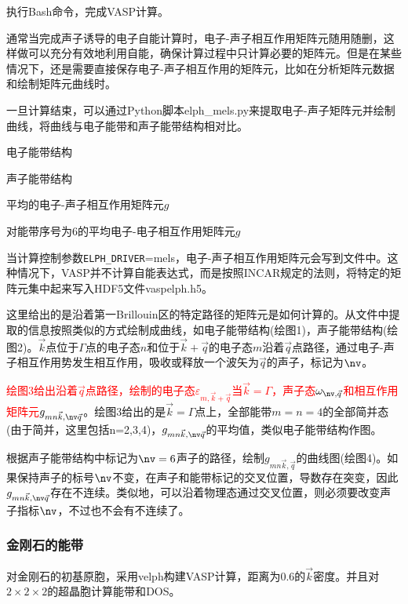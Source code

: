 {执行\textrm{Bash}命令，完成\textrm{VASP}计算。

通常当完成声子诱导的电子自能计算时，电子-声子相互作用矩阵元随用随删，这样做可以充分有效地利用自能，确保计算过程中只计算必要的矩阵元。但是在某些情况下，还是需要直接保存电子-声子相互作用的矩阵元，比如在分析矩阵元数据和绘制矩阵元曲线时。

一旦计算结束，可以通过\textrm{Python}脚本\textrm{elph\_mels.py}来提取电子-声子矩阵元并绘制曲线，将曲线与电子能带和声子能带结构相对比。

电子能带结构

声子能带结构

平均的电子-声子相互作用矩阵元$g$

对能带序号为6的平均电子-电子相互作用矩阵元$g$

当计算控制参数\texttt{ELPH\_DRIVER}=\textrm{mels}，电子-声子相互作用矩阵元会写到文件中。这种情况下，\textrm{VASP}并不计算自能表达式，而是按照\textrm{INCAR}规定的法则，将特定的矩阵元集中起来写入\textrm{HDF5}文件\textrm{vaspelph.h5}。

这里给出的是沿着第一\textrm{Brillouin}区的特定路径的矩阵元是如何计算的。从文件中提取的信息按照类似的方式绘制成曲线，如电子能带结构(绘图1)，声子能带结构(绘图2)。$\vec k$点位于$\Gamma$点的电子态$n$和位于$\vec k+\vec q$的电子态$m$沿着$\vec q$点路径，通过电子-声子相互作用势发生相互作用，吸收或释放一个波矢为$\vec q$的声子，标记为$\nv$。

\textcolor{red}{绘图3给出沿着$\vec q$点路径，绘制的电子态$\varepsilon_{m,\vec k+\vec q}$当$\vec k=\Gamma$，声子态$\omega_{\nv,\vec q}$和相互作用矩阵元$g_{mn\vec k,\nv\vec q}$}。绘图3给出的是$\vec k=\Gamma$点上，全部能带$m=n=4$的全部简并态(由于简并，这里包括n=2,3,4)，$g_{mn\vec k,\nv\vec q}$的平均值，类似电子能带结构作图。%

根据声子能带结构中标记为$\nv=6$声子的路径，绘制$g_{mn\vec k,\vec q}$的曲线图(绘图4)。如果保持声子的标号$\nv$不变，在声子和能带标记的交叉位置，导数存在突变，因此$g_{mn\vec k,\nv\vec q}$存在不连续。类似地，可以沿着物理态通过交叉位置，则必须要改变声子指标$\nv$，不过也不会有不连续了。

\subsubsection{金刚石的能带}
对金刚石的初基原胞，采用\textrm{velph}构建\textrm{VASP}计算，距离为0.6的$\vec k$密度。并且对$2\times2\times2$的超晶胞计算能带和\textrm{DOS}。

}
